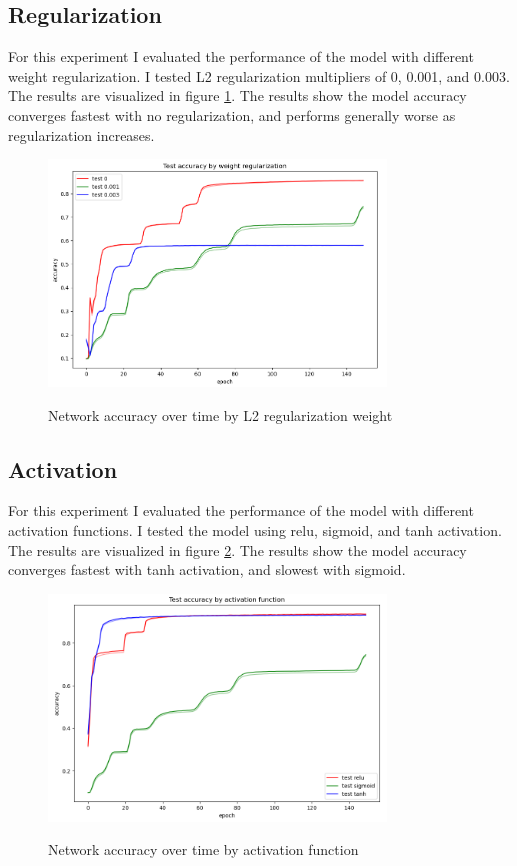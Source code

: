\documentclass{article}
\begin{document}
\subsection{Regularization}
For this experiment I evaluated the performance of the model with different weight regularization. I tested L2 regularization multipliers of 0, 0.001, and 0.003. The results are visualized in figure \ref{fig:reg}. The results show the model accuracy converges fastest with no regularization, and performs generally worse as regularization increases.

\begin{figure}[H]
    \centering
    \includegraphics[width=0.8\textwidth]{part2/experiments/regularization/regularization.png}
    \label{fig:reg}
    \caption{Network accuracy over time by L2 regularization weight}
\end{figure}

\subsection{Activation}
For this experiment I evaluated the performance of the model with different activation functions. I tested the model using relu, sigmoid, and tanh activation. The results are visualized in figure \ref{fig:act}. The results show the model accuracy converges fastest with tanh activation, and slowest with sigmoid.

\begin{figure}[H]
    \centering
    \includegraphics[width=0.8\textwidth]{part2/experiments/activation/activation.png}
    \label{fig:act}
    \caption{Network accuracy over time by activation function}
\end{figure}
\end{document}
